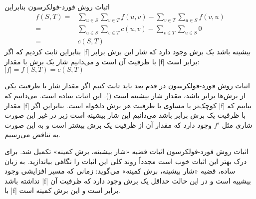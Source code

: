 \begin{itemframe}{اثبات روش فورد-فولکرسون}
\itm
بنابراین
\begin{align*}
f(S, T) = & \sum_{u \in S} \sum_{v \in T} f(u, v) - \sum_{v \in T} \sum_{u \in S} f(v, u)\\
= & \sum_{u \in S} \sum_{v \in T} c(u, v) - \sum_{v \in T} \sum_{u \in S} 0\\
= & c(S, T)
\end{align*}
\itm
بنابراین ثابت کردیم که اگر |f| بیشینه باشد یک برش وجود دارد که شار این برش برابر با ظرفیت آن است و می‌دانیم شار یک برش با مقدار |f| برابر است:
$|f| = f(S,T) = c(S, T)$

\end{itemframe}

\begin{itemframe}{اثبات روش فورد-فولکرسون}
\itm
در قدم بعد باید ثابت کنیم اگر مقدار شار با ظرفیت یکی از برش‌ها برابر باشد، مقدار شار بیشینه است ().
\itm
این اثبات ساده است. می‌دانیم که مقدار |f| کوچک‌تر یا مساوی با ظرفیت هر برش دلخواه است. بنابراین اگر |f| بیابیم که با ظرفیت یک برش برابر باشد می‌دانیم این شار بیشینه است زیر در غیر این صورت شاری مثل
$f'$
وجود دارد که مقدار آن از ظرفیت یک برش بیشتر است و به این صورت به تناقض می‌رسیم.

\end{itemframe}

\begin{itemframe}{اثبات روش فورد-فولکرسون}
\itm
اثبات قضیه «شار بیشینه، برش کمینه» تکمیل شد. برای درک بهتر این اثبات خوب است مجدداً روند کلی این اثبات را نگاهی بیاندازید.
\itm
به زبان ساده، قضیه «شار بیشینه، برش کمینه» می‌گوید: زمانی که مسیر افزایشی وجود نداشته باشد |f| بیشییه است و در این حالت حداقل یک برش وجود دارد که ظرفیت آن با |f| برابر است و این برش کمینه است.
\end{itemframe}